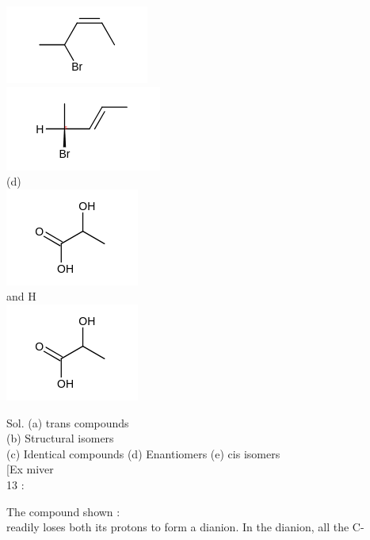 \documentclass[10pt]{article}
\begin{document}
\includegraphics{smile-ce7c1d70fa7ae0b9bee3e98aaeb268c4758ccde6}\\
\includegraphics{smile-236962b8dad4847fd78ca7f05550d7f77d97bc43}\\
(d)\\
\includegraphics{smile-c66f7cb44d9ac8ba08c2255a993599f291f8084a}\\
and H\\
\includegraphics{smile-d132845f1756d91ed38db9bfd97ed53931c20bab}

Sol. (a) trans compounds\\
(b) Structural isomers\\
(c) Identical compounds (d) Enantiomers (e) cis isomers\\[0pt]
[Ex miver\\
13 :

The compound shown :\\
 readily loses both its protons to form a dianion. In the dianion, all the C-
\end{document}
